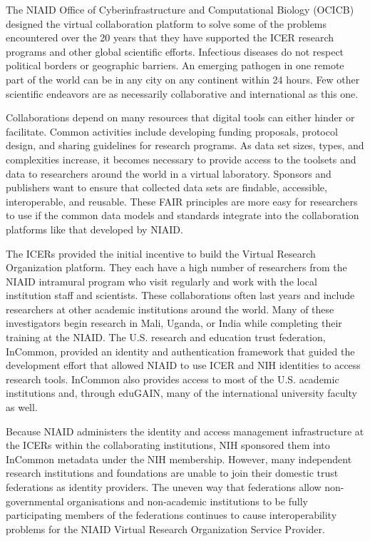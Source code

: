 \documentclass[fleqn,10pt]{wlscirep}
\begin{document}
{The NIAID Office of Cyberinfrastructure and Computational Biology (OCICB) designed the virtual collaboration platform to solve some of the problems encountered over the 20 years that they have supported the ICER research programs and other global scientific efforts.  Infectious diseases do not respect political borders or geographic barriers.  An emerging pathogen in one remote part of the world can be in any city on any continent within 24 hours.  Few other scientific endeavors are as necessarily collaborative and international as this one. 

Collaborations depend on many resources that digital tools can either hinder or facilitate.  Common activities include developing funding proposals, protocol design, and sharing guidelines for research programs.  As data set sizes, types, and complexities increase, it becomes necessary to provide access to the toolsets and data to researchers around the world in a virtual laboratory.  Sponsors and publishers want to ensure that collected data sets are findable, accessible, interoperable, and reusable.  These FAIR principles are more easy for researchers to use if the common data models and standards integrate into the collaboration platforms like that developed by NIAID.

The ICERs provided the initial incentive to build the Virtual Research Organization platform.  They each have a high number of researchers from the NIAID intramural program who visit regularly and work with the local institution staff and scientists.  These collaborations often last years and include researchers at other academic institutions around the world.  Many of these investigators begin research in Mali, Uganda, or India while completing their training at the NIAID.  The U.S. research and education trust federation, InCommon, provided an identity and authentication framework that guided the development effort that allowed NIAID to use ICER and NIH identities to access research tools. InCommon also provides access to most of the U.S. academic institutions and, through eduGAIN, many of the international university faculty as well. 

Because NIAID administers the identity and access management infrastructure at the ICERs within the collaborating institutions, NIH sponsored them into InCommon metadata under the NIH membership.  However, many independent research institutions and foundations are unable to join their domestic trust federations as identity providers.  The uneven way that federations allow non-governmental organisations and non-academic institutions to be fully participating members of the federations continues to cause interoperability problems for the NIAID Virtual Research Organization Service Provider.

}
\end{document}

